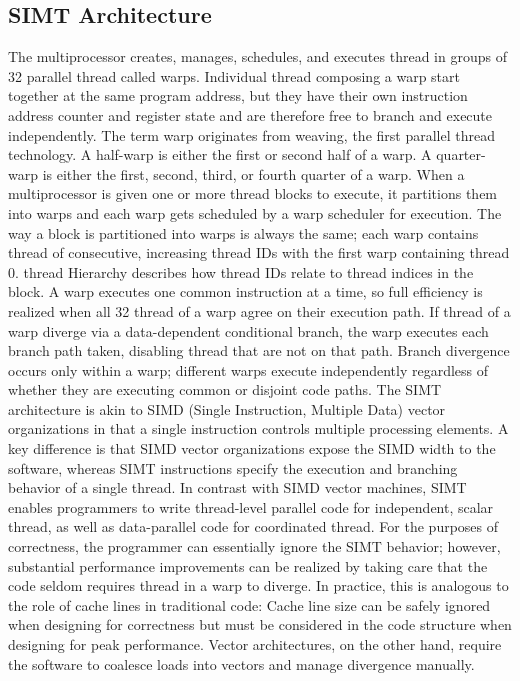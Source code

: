 \documentclass[openany]{book}
\begin{document}
\subsection{SIMT Architecture}%
The multiprocessor creates, manages, schedules, and executes thread in groups of 32 parallel thread called warps. Individual thread composing a warp start together at the same program address, but they have their own instruction address counter and register state and are therefore free to branch and execute independently. The term warp originates from weaving, the first parallel thread technology. A half-warp is either the first or second half of a warp. A quarter-warp is either the first, second, third, or fourth quarter of a warp.
When a multiprocessor is given one or more thread blocks to execute, it partitions them into warps and each warp gets scheduled by a warp scheduler for execution. The way a block is partitioned into warps is always the same; each warp contains thread of consecutive, increasing thread IDs with the first warp containing thread 0. thread Hierarchy describes how thread IDs relate to thread indices in the block.
A warp executes one common instruction at a time, so full efficiency is realized when all 32 thread of a warp agree on their execution path. If thread of a warp diverge via a data-dependent conditional branch, the warp executes each branch path taken, disabling thread that are not on that path. Branch divergence occurs only within a warp; different warps execute independently regardless of whether they are executing common or disjoint code paths.
The SIMT architecture is akin to SIMD (Single Instruction, Multiple Data) vector organizations in that a single instruction controls multiple processing elements. A key difference is that SIMD vector organizations expose the SIMD width to the software, whereas SIMT instructions specify the execution and branching behavior of a single thread. In contrast with SIMD vector machines, SIMT enables programmers to write thread-level parallel code for independent, scalar thread, as well as data-parallel code for coordinated thread. For the purposes of correctness, the programmer can essentially ignore the SIMT behavior; however, substantial performance improvements can be realized by taking care that the code seldom requires thread in a warp to diverge. In practice, this is analogous to the role of cache lines in traditional code: Cache line size can be safely ignored when designing for correctness but must be considered in the code structure when designing for peak performance. Vector architectures, on the other hand, require the software to coalesce loads into vectors and manage divergence manually.
\end{document}
